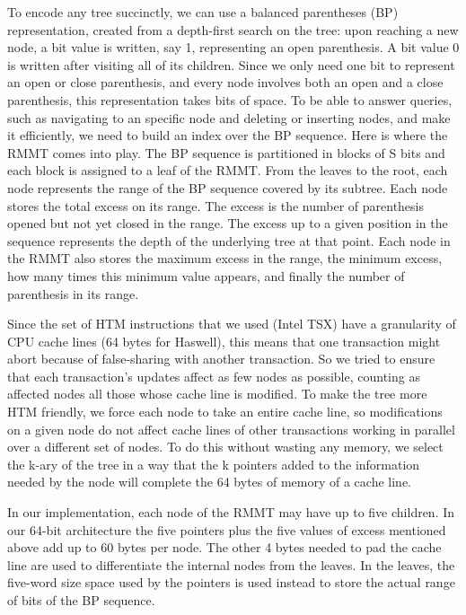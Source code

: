 \documentclass{llncs}
\begin{document}
To encode any tree succinctly, we can use a balanced parentheses (BP) representation, created from a depth-first search on the tree: upon reaching a new node, a bit value is written, say 1, representing an open parenthesis. A bit value 0 is written after visiting all of its children. Since we only need one bit to represent an open or close parenthesis, and every node involves both an open and a close parenthesis, this representation takes  bits of space. To be able to answer queries, such as navigating to an specific node and deleting or inserting nodes, and make it efficiently, we need to build an index over the BP sequence. Here is where the RMMT comes into play. The BP sequence is partitioned in blocks of S bits and each block is assigned to a leaf of the RMMT. From the leaves to the root, each node represents the range of the BP sequence covered by its subtree. Each node stores the total excess on its range. The excess is the number of parenthesis opened but not yet closed in the range. The excess up to a given position in the sequence represents the depth of the underlying tree at that point. Each node in the RMMT also stores the maximum excess in the range, the minimum excess, how many times this minimum value appears, and finally the number of parenthesis in its range. 

Since the set of HTM instructions that we used (Intel TSX) have a granularity of CPU cache lines (64 bytes for Haswell), this means that one transaction might abort because of false-sharing with another transaction. So we tried to ensure that each transaction's updates affect as few nodes as possible, counting as affected nodes all those whose cache line is modified. To make the tree more HTM friendly, we force each node to take an entire cache line, so modifications on a given node do not affect cache lines of other transactions working in parallel over a different set of nodes. To do this without wasting any memory, we select the k-ary of the tree in a way that the k pointers added to the information needed by the node will complete the 64 bytes of memory of a cache line.

In our implementation, each node of the RMMT may have up to five children. In our 64-bit architecture the five pointers plus the five values of excess mentioned above add up to 60 bytes per node. The other 4 bytes needed to pad the cache line are used to differentiate the internal nodes from the leaves. In the leaves, the five-word size space used by the pointers is used instead to store the actual range of bits of the BP sequence.
\end{document}
